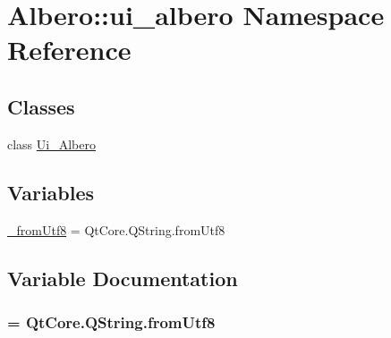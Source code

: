\hypertarget{namespaceAlbero_1_1ui__albero}{
\section{Albero::ui\_\-albero Namespace Reference}
\label{namespaceAlbero_1_1ui__albero}
}
\subsection*{Classes}
\begin{DoxyCompactItemize}
\item 
class \hyperlink{classAlbero_1_1ui__albero_1_1Ui__Albero}{Ui\_\-Albero}
\end{DoxyCompactItemize}
\subsection*{Variables}
\begin{DoxyCompactItemize}
\item 
\hyperlink{namespaceAlbero_1_1ui__albero_adc8f86bdf8c04210cd2d64a9c0818505}{\_\-fromUtf8} = QtCore.QString.fromUtf8
\end{DoxyCompactItemize}


\subsection{Variable Documentation}
\hypertarget{namespaceAlbero_1_1ui__albero_adc8f86bdf8c04210cd2d64a9c0818505}{
\subsubsection[{\_\-fromUtf8}]{ = QtCore.QString.fromUtf8}}
\label{namespaceAlbero_1_1ui__albero_adc8f86bdf8c04210cd2d64a9c0818505}
